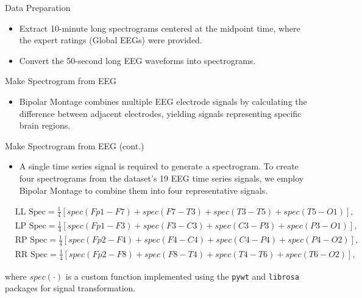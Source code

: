 \documentclass[leqno]{beamer}
\newcommand\pkg[1]{\texttt{#1}}
\begin{document}
\begin{frame}{Data Preparation}
\begin{itemize}
\item Extract 10-minute long spectrograms centered at the midpoint time,
where the expert ratings (Global EEGs) were provided.
\bigskip
\item Convert the 50-second long EEG waveforms into spectrograms.
\end{itemize}
\end{frame}


\begin{frame}{Make Spectrogram from EEG}
\begin{itemize}
\item Bipolar Montage combines multiple EEG electrode signals by calculating
the difference between adjacent electrodes, yielding signals representing
specific brain regions.
\end{itemize}
\begin{figure}[tbp]
\centering
\end{figure}
\end{frame}


\begin{frame}{Make Spectrogram from EEG (cont.)}
\begin{itemize} 
\item A single time series signal is required to generate a spectrogram.
To create four spectrograms from the dataset's 19 EEG time series signals,
we employ Bipolar Montage to combine them into four representative signals.
\end{itemize}
\begin{footnotesize}
\begin{align*}
& \text{LL Spec} = \frac{1}{4} \left[
spec(Fp1-F7) + spec(F7-T3) + spec(T3-T5) + spec(T5-O1) \right], \\
& \text{LP Spec} = \frac{1}{4} \left[
spec(Fp1-F3) + spec(F3-C3) + spec(C3-P3) + spec(P3-O1) \right], \\
& \text{RP Spec} = \frac{1}{4} \left[
spec(Fp2-F4) + spec(F4-C4) + spec(C4-P4) + spec(P4-O2) \right], \\
& \text{RR Spec} = \frac{1}{4} \left[
spec(Fp2-F8) + spec(F8-T4) + spec(T4-T6) + spec(T6-O2) \right],
\end{align*}
\end{footnotesize}
where $spec(\cdot)$ is a custom function implemented using the \pkg{pywt} and
\pkg{librosa} packages for signal transformation.
\end{frame}
\end{document}
